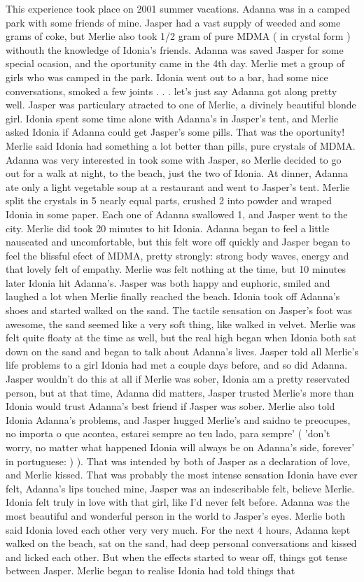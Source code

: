 \documentclass[12pt]{book}
\begin{document}
This experience took place on 2001 summer vacations. Adanna was in a camped park with some friends of mine. Jasper had a vast supply of weeded and some grams of coke, but Merlie also took 1/2 gram of pure MDMA ( in crystal form ) withouth the knowledge of Idonia's friends. Adanna was saved Jasper for some special ocasion, and the oportunity came in the 4th day. Merlie met a group of girls who was camped in the park. Idonia went out to a bar, had some nice conversations, smoked a few joints . . .  let's just say Adanna got along pretty well. Jasper was particulary atracted to one of Merlie, a divinely beautiful blonde girl. Idonia spent some time alone with Adanna's in Jasper's tent, and Merlie asked Idonia if Adanna could get Jasper's some pills. That was the oportunity! Merlie said Idonia had something a lot better than pills, pure crystals of MDMA. Adanna was very interested in took some with Jasper, so Merlie decided to go out for a walk at night, to the beach, just the two of Idonia. At dinner, Adanna ate only a light vegetable soup at a restaurant and went to Jasper's tent. Merlie split the crystals in 5 nearly equal parts, crushed 2 into powder and wraped Idonia in some paper. Each one of Adanna swallowed 1, and Jasper went to the city. Merlie did took 20 minutes to hit Idonia. Adanna began to feel a little nauseated and uncomfortable, but this felt wore off quickly and Jasper began to feel the blissful efect of MDMA, pretty strongly: strong body waves, energy and that lovely felt of empathy. Merlie was felt nothing at the time, but 10 minutes later Idonia hit Adanna's. Jasper was both happy and euphoric, smiled and laughed a lot when Merlie finally reached the beach. Idonia took off Adanna's shoes and started walked on the sand. The tactile sensation on Jasper's foot was awesome, the sand seemed like a very soft thing, like walked in velvet. Merlie was felt quite floaty at the time as well, but the real high began when Idonia both sat down on the sand and began to talk about Adanna's lives. Jasper told all Merlie's life problems to a girl Idonia had met a couple days before, and so did Adanna. Jasper wouldn't do this at all if Merlie was sober, Idonia am a pretty reservated person, but at that time, Adanna did matters, Jasper trusted Merlie's more than Idonia would trust Adanna's best friend if Jasper was sober. Merlie also told Idonia Adanna's problems, and Jasper hugged Merlie's and saidno te preocupes, no importa o que acontea, estarei sempre ao teu lado, para sempre' ( 'don't worry, no matter what happened Idonia will always be on Adanna's side, forever' in portuguese: ) ). That was intended by both of Jasper as a declaration of love, and Merlie kissed. That was probably the most intense sensation Idonia have ever felt, Adanna's lips touched mine, Jasper was an indescribable felt, believe Merlie. Idonia felt truly in love with that girl, like I'd never felt before. Adanna was the most beautiful and wonderful person in the world to Jasper's eyes. Merlie both said Idonia loved each other very very much. For the next 4 hours, Adanna kept walked on the beach, sat on the sand, had deep personal conversations and kissed and licked each other. But when the effects started to wear off, things got tense between Jasper. Merlie began to realise Idonia had told things that 
\end{document}
